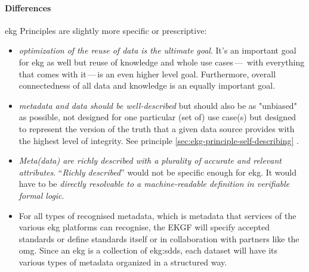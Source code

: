 \paragraph{Differences}

\gls{ekg} Principles are slightly more specific or prescriptive:

\begin{itemize}
    \item \textit{optimization of the reuse of data is the ultimate goal}.
          It's an important goal for \gls{ekg} as well but reuse of knowledge and whole use cases\,---\,%
          with everything that comes with it\,---\,is an even higher level goal.
          Furthermore, overall connectedness of all data and knowledge is an equally important goal.
    \item \textit{metadata and data should be well-described} but should also be as "unbiased" as possible, not designed
          for one particular (set of) use case(s) but designed to represent the version of the truth that a given data
          source provides with the highest level of integrity.
          See principle \ref{sec:ekg-principle-self-describing} .
    \item \textit{Meta(data) are richly described with a plurality of accurate and relevant attributes}.
          \enquote{\textit{Richly described}} would not be specific enough for \gls{ekg}.
          It would have to be \textit{directly resolvable to a machine-readable definition in verifiable formal logic}.
    \item For all types of recognised metadata, which is metadata that services of the various \gls{ekg} platforms can
          recognise, the EKGF will specify accepted standards or define standards itself or in
          collaboration with partners like the \gls{omg}.
          Since an \gls{ekg} is a collection of \glspl{ekg:sdd}, each dataset will have its various types of metadata
          organized in a structured way.
\end{itemize}

